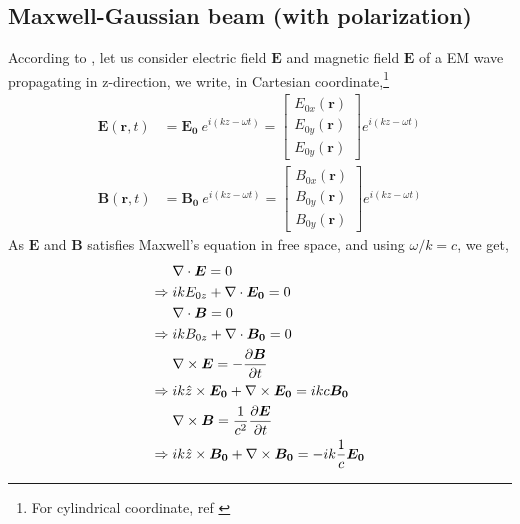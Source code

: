 \documentclass[11pt,a4paper]{article}
\numberwithin{equation}{section}
\begin{document}
\subsection{Maxwell-Gaussian beam (with polarization)}
According to \cite{erikson 94}, let us consider electric field $\boldsymbol{E}$ and magnetic field $\boldsymbol{E}$ of a EM wave propagating in z-direction, we write, in Cartesian coordinate,\footnote{For cylindrical coordinate, ref \cite{lewis 14}}
\begin{align}
	\boldsymbol{E}(\boldsymbol{r},t)
	&= \boldsymbol{E_0}\: e^{i(kz - \omega t)}
	= \begin{bmatrix}
		E_{0x}(\boldsymbol{r})\\E_{0y}(\boldsymbol{r})\\E_{0y}(\boldsymbol{r})
	\end{bmatrix} e^{i(kz - \omega t)}\\
	\boldsymbol{B}(\boldsymbol{r},t)
	&= \boldsymbol{B_0}\: e^{i(kz - \omega t)}
	= \begin{bmatrix}
		B_{0x}(\boldsymbol{r})\\B_{0y}(\boldsymbol{r})\\B_{0y}(\boldsymbol{r})
	\end{bmatrix} e^{i(kz - \omega t)}
\end{align}
As $\boldsymbol{E}$ and $\boldsymbol{B}$ satisfies Maxwell's equation in free space\cite{max eq - wiki}, and using $\omega/k = c$, we get,
\begin{align}
	&\nabla\cdot\boldsymbol{E}=0\\
	\Rightarrow\;& ikE_{0z}+\nabla\cdot\boldsymbol{E_0}=0\label{eq:2.65}\\
	&\nabla\cdot\boldsymbol{B}=0\\
	\Rightarrow\;& ikB_{0z}+\nabla\cdot\boldsymbol{B_0}=0\label{eq:2.67}\\
	&\nabla\times\boldsymbol{E}= -\frac{\partial \boldsymbol{B}}{\partial t}\\
	\Rightarrow\;& ik\Hat{z}\times\boldsymbol{E_0}+ \nabla\times\boldsymbol{E_0}
	=ikc\boldsymbol{B_0}\label{eq:2.69}\\
	&\nabla\times\boldsymbol{B}=\frac{1}{c^2}\frac{\partial\boldsymbol{E}}{\partial t}\\
	\Rightarrow\;& ik\Hat{z}\times\boldsymbol{B_0}+ \nabla\times\boldsymbol{B_0}
	=-ik\frac{1}{c}\boldsymbol{E_0}\label{eq:2.71}
\end{align}
\end{document}

